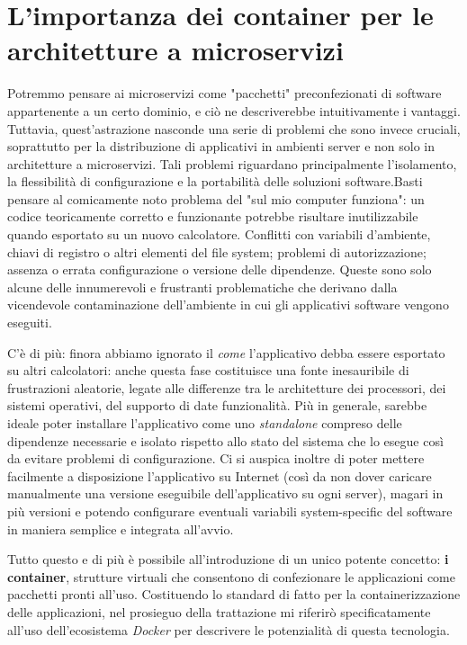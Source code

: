 \section{L'importanza dei container per le architetture a microservizi}
Potremmo pensare ai microservizi come "pacchetti" preconfezionati di software appartenente a un certo dominio, e ciò ne descriverebbe intuitivamente i vantaggi. Tuttavia, quest'astrazione nasconde una serie di problemi che sono invece cruciali, soprattutto per la distribuzione di applicativi in ambienti server e non solo in architetture a microservizi.
Tali problemi riguardano principalmente l'isolamento, la flessibilità di configurazione e la portabilità delle soluzioni software.Basti pensare al comicamente noto problema del "sul mio computer funziona": un codice teoricamente corretto e funzionante potrebbe risultare inutilizzabile quando esportato su un nuovo calcolatore.
Conflitti con variabili d'ambiente, chiavi di registro o altri elementi del file system; problemi di autorizzazione; assenza o errata configurazione o versione delle dipendenze. Queste sono solo alcune delle innumerevoli e frustranti problematiche che derivano dalla vicendevole contaminazione dell'ambiente in cui gli applicativi software vengono eseguiti.

C'è di più: finora abbiamo ignorato il \emph{come} l'applicativo debba essere esportato su altri calcolatori: anche questa fase costituisce una fonte inesauribile di frustrazioni aleatorie, legate alle differenze tra le architetture dei processori, dei sistemi operativi, del supporto di date funzionalità. Più in generale, sarebbe ideale poter installare l'applicativo come uno \emph{standalone} compreso delle dipendenze necessarie e isolato rispetto allo stato del sistema che lo esegue così da evitare problemi di configurazione. Ci si auspica inoltre di poter mettere facilmente a disposizione l'applicativo su Internet (così da non dover caricare manualmente una versione eseguibile dell'applicativo su ogni server), magari in più versioni e potendo configurare eventuali variabili system-specific del software in maniera semplice e integrata all'avvio.

Tutto questo e di più è possibile all'introduzione di un unico potente concetto: \textbf{i container}, strutture virtuali che consentono di confezionare le applicazioni come pacchetti pronti all'uso.
Costituendo lo standard di fatto per la containerizzazione delle applicazioni, nel prosieguo della trattazione mi riferirò specificatamente all'uso dell'ecosistema \emph{Docker} per descrivere le potenzialità di questa tecnologia.


